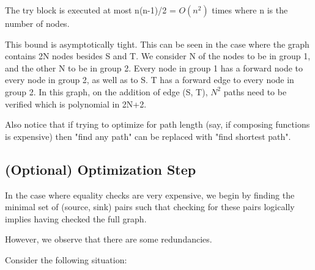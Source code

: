 \documentclass{article}
\begin{document}
The try block is executed at most n(n-1)/2 = $O(n^2)$ times where n is the number of nodes.

This bound is asymptotically tight.
This can be seen in the case where the graph contains 2N nodes besides S and T. We consider N of the nodes to be in group 1, and the other N to be in group 2. Every node in group 1 has a forward node to every node in group 2, as well as to S. T has a forward edge to every node in group 2. In this graph, on the addition of edge (S, T), $N^2$ paths need to be verified which is polynomial in 2N+2.

Also notice that if trying to optimize for path length (say, if composing functions is expensive) then "find any path" can be replaced with "find shortest path".


\subsection{(Optional) Optimization Step}

In the case where equality checks are very expensive, we begin by finding the minimal set of (source, sink) pairs such that checking for these pairs logically implies having checked the full graph.

However, we observe that there are some redundancies.

Consider the following situation:
\end{document}
